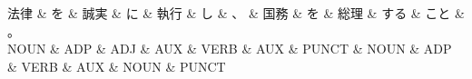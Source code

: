 \documentclass[tikz,border=5pt]{standalone}
\begin{document}
\normalsize
\begin{dependency}[edge unit distance=12.0pt]
    \begin{deptext}[column sep=1em]
        法律 \& を \& 誠実 \& に \& 執行 \& し \& 、 \& 国務 \& を \& 総理 \& する \& こと \& 。\\
        NOUN \& ADP \& ADJ \& AUX \& VERB \& AUX \& PUNCT \& NOUN \& ADP \& VERB \& AUX \& NOUN \& PUNCT\\
    \end{deptext}
\end{dependency}
\end{document}

